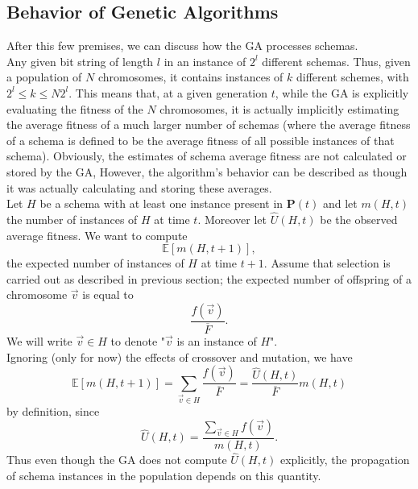 \documentclass[%
    corpo=11pt,
    twoside,
    stile=classica,
    oldstyle,
    autoretitolo,
    tipotesi=magistrale,
    greek,
    evenboxes,
    english
]{toptesi}
\begin{document}
\subsection{Behavior of Genetic Algorithms}
\label{gabehavior}
After this few premises, we can discuss how the GA processes schemas. \\
Any given bit string of length $l$ in an instance of $2^l$ different schemas. Thus, given a population of $N$ chromosomes, it contains instances of $k$ different schemes, with $2^l \leq k \leq N2^l$. This means that, at a given generation $t$, while the GA is explicitly evaluating the fitness of the $N$ chromosomes, it is actually implicitly estimating the average fitness of a much larger number of schemas (where the average fitness of a schema is defined to be the average fitness of all possible instances of that schema). Obviously, the estimates of schema average fitness are not calculated or stored by the GA, However, the algorithm's behavior can be described as though it was actually calculating and storing these averages. \\
Let $H$ be a schema with at least one instance present in $\textbf{P}(t)$ and let $m(H,t)$ the number of instances of $H$ at time $t$. Moreover let $\hat{U}(H,t)$ be the observed average fitness. We want to compute 
\begin{equation}
\mathbb{E}\left[m(H, t + 1) \right],
\end{equation}
the expected number of instances of $H$ at time $t+1$. Assume that selection is carried out as described in previous section; the expected number of offspring of a chromosome $\vec{v}$ is equal to
\begin{equation}
\frac{f(\vec{v})}{\overline{F}}.
\end{equation}
We will write $\vec{v} \in H$ to denote "$\vec{v}$ is an instance of $H$". \\
Ignoring (only for now) the effects of crossover and mutation, we have
\begin{equation}
\label{expectedmult}
\mathbb{E}\left[m(H, t + 1) \right] = \sum_{\vec{v} \in H}\frac{f(\vec{v})}{\overline{F}} = \frac{\hat{U}(H,t)}{\overline{F}}m(H,t)
\end{equation}
by definition, since
\begin{equation}
\hat{U}(H,t) = \frac{\sum_{\vec{v} \in H}f(\vec{v})}{m(H,t)}.
\end{equation}
Thus even though the GA does not compute $\hat{U}(H,t)$ explicitly, the propagation of schema instances in the population depends on this quantity. \\
\end{document}
